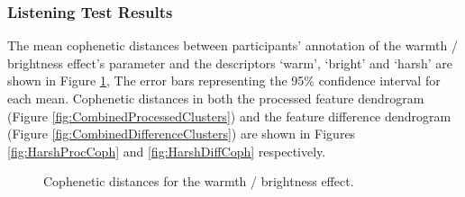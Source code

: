 		\subsubsection{Listening Test Results}
			The mean cophenetic distances between participants' annotation of the warmth / brightness effect's
			parameter and the descriptors `warm', `bright' and `harsh' are shown in Figure
			\ref{fig:HarshCophs}, The error bars representing the 95\% confidence interval for each mean.
			Cophenetic distances in both the processed feature dendrogram (Figure
			\ref{fig:CombinedProcessedClusters}) and the feature difference dendrogram (Figure
			\ref{fig:CombinedDifferenceClusters}) are shown in Figures \ref{fig:HarshProcCoph} and
			\ref{fig:HarshDiffCoph} respectively.

			\begin{figure}[h!]
				\centering
				\quad
				\caption{Cophenetic distances for the warmth / brightness effect.}
				\label{fig:HarshCophs}
			\end{figure}


